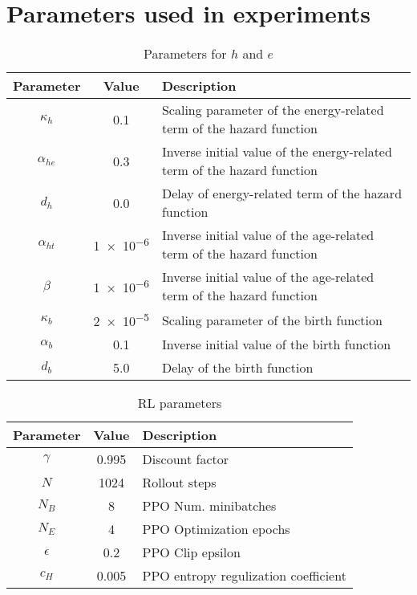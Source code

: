 \section{Parameters used in experiments}\label{ap-a}

\begin{table}[t]
  \centering
  \caption{Parameters for $h$ and $e$}\label{tab:bd-learn-param}
  \begin{tabular}{ccl}
  \toprule
    Parameter & Value & Description \\
    \midrule
    $\kappa_{h}$ & 0.1 & Scaling parameter of the energy-related term of the hazard function \\
    $\alpha_{he}$ & 0.3 & Inverse initial value of the energy-related term of the hazard function \\
    $d_{h}$ & 0.0 & Delay of energy-related term of the hazard function \\
    $\alpha_{ht}$ & \num{1e-6} & Inverse initial value of the age-related term of the hazard function \\
    $\beta$ & \num{1e-6} & Inverse initial value of the age-related term of the hazard function \\
    $\kappa_{b}$ & \num{2e-5} & Scaling parameter of the birth function\\
    $\alpha_{b}$ & 0.1 & Inverse initial value of the birth function \\
    $d_{b}$ & 5.0 & Delay of the birth function \\
    \bottomrule
  \end{tabular}
\end{table}

\begin{table}[t]
  \centering
  \caption{RL parameters}\label{tab:rl-param}
  \begin{tabular}{ccl}
  \toprule
    Parameter & Value & Description \\
    \midrule
    $\gamma$ & 0.995 & Discount factor \\
    $N$ & 1024 & Rollout steps \\
    $N_{B}$ & 8 & PPO Num. minibatches \\
    $N_{E}$ & 4 & PPO Optimization epochs \\
    $\epsilon$ & 0.2 & PPO Clip epsilon \\
    $c_{H}$ & 0.005 & PPO entropy regulization coefficient \\
  \end{tabular}
\end{table}
